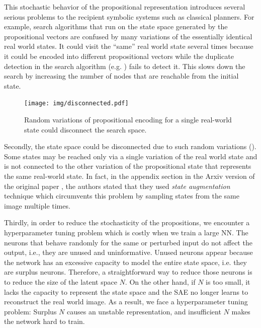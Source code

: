 This stochastic behavior of the propositional representation
introduces several serious problems to the recipient symbolic systems such as classical planners.
% 
For example,
search algorithms that run on the state space generated by the propositional vectors
are confused by many variations of the essentially identical real world states.
It could visit the ``same'' real world state several times because
it could be encoded into different propositional vectors
while the duplicate detection in the search algorithm (e.g. \astar) fails to detect it.
This slows down the search by increasing the number of nodes that are reachable from the initial state.

\begin{figure}[tb]
 \centering
 \texttt{[image: img/disconnected.pdf]}
 \caption{Random variations of propositional encoding for a single real-world state could disconnect the search space.}
 \label{disconnected}
\end{figure}

Secondly, the state space could be disconnected due to such random variations ().
Some states may be reached only via a single variation of the real world state and is not connected to the
other variation of the propositional state that represents the same real-world state.
In fact, in the appendix section in the Arxiv version of the original paper \cite{Asai2018},
the authors stated that they used \emph{state augmentation} technique
which circumvents this problem by sampling states from the same image multiple times.

Thirdly, in order to reduce the stochasticity of the propositions, we encounter a hyperparameter tuning problem
which is costly when we train a large NN.
% 
The neurons that behave randomly for the same or perturbed input do not affect the output,
i.e., they are unused and uninformative.
Unused neurons appear because the network has an excessive capacity to 
model the entire state space, i.e. they are surplus neurons.
Therefore, a straightforward way to reduce those neurons is to reduce the size of the latent space $N$.
On the other hand, if $N$ is too small, it lacks the capacity to represent the state space
and the SAE no longer learns to reconstruct the real world image.
As a result, we face a hyperparameter tuning problem: Surplus $N$ causes an unstable representation,
and insufficient $N$ makes the network hard to train.


